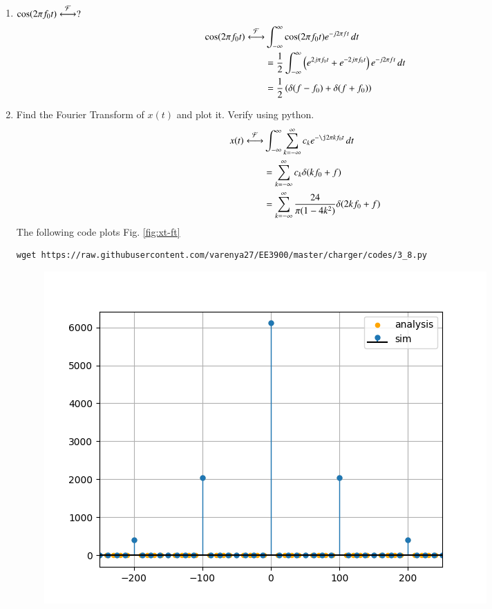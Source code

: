 \documentclass[journal,12pt,twocolumn]{IEEEtran}
\renewcommand\thesection{\arabic{section}}
\begin{document}
\begin{enumerate}[label=\thesection.\arabic*
,ref=\thesection.\theenumi]
 \begin{align}
     e^{-j2\pi f_0t}\system{F}&\int _{-\infty}^{\infty} e^{-j2\pi f_0t}e^{-j2\pi ft}\,dt\\
     &= \int _{-\infty}^{\infty} e^{-j2\pi \brak{f+f_0}t}\,dt\\
     &= \delta(f+f_0)
 \end{align}
 \item $\cos(2\pi f_0t)\overset{\mathcal{F}}{ \longleftrightarrow}?$\\\solution
 \begin{align}
     \cos(2\pi f_0t)\overset{\mathcal{F}}{ \longleftrightarrow}&\int_{-\infty}^{\infty} \cos(2\pi f_0t)e^{-j2\pi ft}\,dt\\
     &= \frac{1}{2}\int_{-\infty}^{\infty} \left(e^{2j\pi f_0t}+e^{-2j\pi f_0t}\right)e^{-j2\pi ft}\,dt\\
     &= \frac{1}{2}\left(\delta(f-f_0) +\delta(f+f_0)\right)
 \end{align}
 \item Find the Fourier Transform of $x(t)$ and plot it.  Verify using python.\\\solution
 \begin{align}
     x(t)\system{F}&\int_{-\infty}^\infty\sum_{k=-\infty}^\infty c_k e^{-\j2\pi kf_0t}\,dt\\
     &= \sum_{k=-\infty}^\infty c_k \delta(kf_0+f)\\
     &= \sum_{k=-\infty}^\infty \frac{24}{\pi(1-4k^2)}\delta(2kf_0+f)
 \end{align}
 The following code plots Fig. \ref{fig:xt-ft}
	\begin{lstlisting}
wget https://raw.githubusercontent.com/varenya27/EE3900/master/charger/codes/3_8.py
\end{lstlisting}
	\begin{figure}[h!]
	    \centering
	    \includegraphics[width=\columnwidth]{figures/xt-ft.png}

\end{figure}
\end{enumerate}
\end{document}
